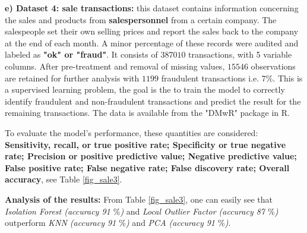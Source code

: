 \noindent \textbf{e) Dataset 4: sale transactions:} this dataset contains information concerning the sales and products from \textbf{salespersonnel} from a certain company. The salespeople set their own selling prices and report the sales back to the company at the end of each month. A minor percentage of these records were audited and labeled as \textbf{"ok" or "fraud"}. It consists of $387010$ transactions, with 5 variable columns. After pre-treatment and removal of missing values, $15546$ observations are retained for further analysis with $1199$ fraudulent transactions i.e. $7 \%$. This is a supervised learning problem, the goal is the to train the model to correctly identify fraudulent and non-fraudulent transactions and predict the result for the remaining transactions. The data is available from the "DMwR" package in R.  

To evaluate the model's performance, these quantities are considered: \textbf{
Sensitivity, recall, or true positive rate; Specificity or true negative rate; Precision or positive predictive value; Negative predictive value; False positive rate; False negative rate; False discovery rate; Overall accuracy}, see Table \ref{fig_sale3}.

\noindent\textbf{Analysis of the results:} From Table \eqref{fig_sale3}, one can easily see that \textit{Isolation Forest (accuracy 91 $\%$)} and \textit{Local Outlier Factor (accuracy 87 $\%$)} outperform \textit{KNN (accuracy 91 $\%$)} and \textit{PCA (accuracy 91 $\%$)}.

